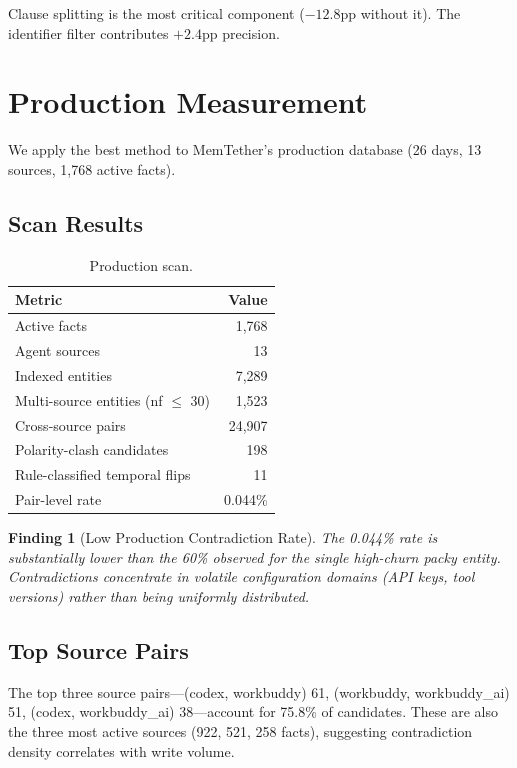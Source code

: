 \documentclass{article}
\newtheorem{finding}{Finding}
\begin{document}
Clause splitting is the most critical component ($-12.8$pp without it). The identifier filter contributes $+2.4$pp precision.


\section{Production Measurement}
\label{sec:production}

We apply the best method to MemTether's production database (26 days, 13 sources, 1{,}768 active facts).

\subsection{Scan Results}

\begin{table}[h]
\centering
\caption{Production scan.}
\begin{tabular}{lr}
\toprule
Metric & Value \\
\midrule
Active facts & 1{,}768 \\
Agent sources & 13 \\
Indexed entities & 7{,}289 \\
Multi-source entities (nf $\leq$ 30) & 1{,}523 \\
Cross-source pairs & 24{,}907 \\
Polarity-clash candidates & 198 \\
Rule-classified temporal flips & 11 \\
Pair-level rate & 0.044\% \\
\bottomrule
\end{tabular}
\label{tab:prod}
\end{table}

\begin{finding}[Low Production Contradiction Rate]
The 0.044\% rate is substantially lower than the 60\% observed for the single high-churn \emph{packy} entity. Contradictions concentrate in volatile configuration domains (API keys, tool versions) rather than being uniformly distributed.
\end{finding}

\subsection{Top Source Pairs}
The top three source pairs---(codex, workbuddy) 61, (workbuddy, workbuddy\_ai) 51, (codex, workbuddy\_ai) 38---account for 75.8\% of candidates. These are also the three most active sources (922, 521, 258 facts), suggesting contradiction density correlates with write volume.
\end{document}
